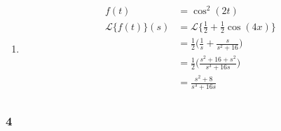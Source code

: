 \documentclass[a4paper]{article}
\newcommand{\ex}[1]{\subsubsection*{#1}}
\begin{document}
\begin{enumerate}[label=\alph*)]
\begin{align}
{                using this with the table for \(\frac{1}{a}\sinh{at}\) the
                final result was quite beautiful, but as I realise now it was
                also very very wrong (setting \(at = it\pm t\)). What a shame.}
            &= \frac{1}{4}\int_0^\infty{e^{it+t-st} - e^{it-t-st} +
                e^{-it+t-st} - e^{-it-t-st} dt} \\
            &= \frac{1}{4}\int_0^\infty{e^{t(i+1-s)} - e^{t(i-1-s)} +
                e^{t(-i+1-s)} - e^{t(-i-1-s)} dt} \\
            &= \frac{1}{4} \Big[ \frac{1}{i+1-s}e^{t(i+1-s)} -
                \frac{1}{i-1-s}e^{t(i-1-s)} + \frac{1}{-i+1-s}e^{t(-i+1-s)} -
                \frac{1}{-i-1-s}e^{t(-i-1-s)}  \Big]_0^\infty      \\
            &= \frac{1}{4} \Big[ \frac{e^{t(i-1-s)}}{(s+1)-i}
                +\frac{e^{t(-i-1-s)}}{(s+1)+i} - \frac{e^{t(-i+1-s)}}{(s-1)+i}
                - \frac{e^{t(i+1-s)}}{(s-1)-i} \Big]_0^\infty      \\
            &= \frac{1}{4} \Big[ \frac{e^{t(i-1-s)}((s+1)+i)
                + e^{t(-i-1-s)}((s+1)-i)}{(s+1)^2+1}
                - \frac{e^{t(-i+1-s)}((s-1)-i)
                + e^{t(i+1-s)}((s-1)+i)}{(s-1)^2+1} \Big]_0^\infty      \\
        \end{align}

    \item
        \begin{align}
            f(t) &= \cos^2(2t) \\
            \mathscr{L}\{f(t)\}(s) &= \mathscr{L}\{\frac{1}{2}+\frac{1}{2}\cos(4x)\} \\
            &= \frac{1}{2}\Big(\frac{1}{s}+\frac{s}{s^2+16}\Big) \\
            &= \frac{1}{2}\Big(\frac{s^2+16 + s^2}{s^3+16s}\Big) \\
            &= \frac{s^2+8}{s^3+16s} \\
        \end{align}
\end{enumerate}


\ex{4}
\end{document}
